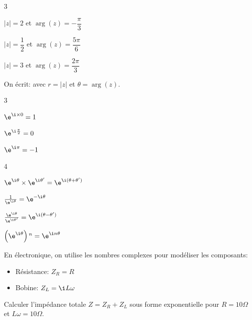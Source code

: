 \begin{exercice_cours}

	\begin{enumerate}

	\end{enumerate}

\end{exercice_cours}



\begin{propriete}
	On écrit:  avec $r = |z|$ et $\theta = \arg(z)$.
\end{propriete}


\begin{propriete}

\begin{enumerate}
	\begin{multicols}{3}
	\item $\e^{\i \times 0}=1$
	\item $\e^{\i  \frac{\pi}{2}}=0$
 	\item $\e^{\i \pi}=-1$

	\end{multicols}

	\begin{multicols}{4}
	\item $\e^{\i \theta}\times \e^{\i \theta'}=\e^{\i (\theta+\theta')}$
	\item $\frac{1}{\e^{\i \theta}}=\e^{-\i \theta}$
	\item $\frac{\e^{\i \theta}}{\e^{\i \theta'}}=\e^{\i (\theta-\theta')}$
	\item $\left(\e^{\i \theta}\right){}^n=\e^{\i n\theta}$

	\end{multicols}
\end{enumerate}

\end{propriete}


\begin{exercice_cours}
	En électronique, on utilise les nombres complexes pour modéliser les composants:
    \begin{itemize}
        \item Résistance: $Z_R = R$
        \item Bobine: $Z_L = \i L\omega$
    \end{itemize}
    Calculer l'impédance totale $Z = Z_R + Z_L$ sous forme exponentielle pour $R=10\Omega$ et $L\omega=10\Omega$.
\end{exercice_cours}



